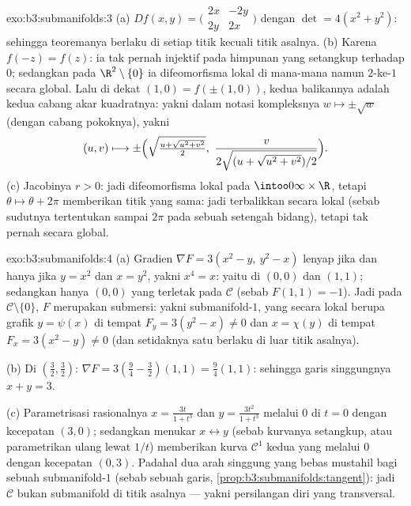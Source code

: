 \begin{solution}{exo:b3:submanifolds:3}
(a) $Df(x,y) = \bigl(\begin{smallmatrix}2x & -2y\\ 2y &
2x\end{smallmatrix}\bigr)$ dengan $\det = 4(x^2 + y^2)$: sehingga
teoremanya berlaku di setiap titik kecuali titik asalnya.
(b) Karena $f(-z) = f(z)$: ia tak pernah injektif pada himpunan yang setangkup terhadap
$0$; sedangkan pada $\R^2\setminus\{0\}$ ia difeomorfisma lokal
di mana-mana namun $2$-ke-$1$ secara global. Lalu di dekat $(1, 0) = f(\pm(1,
0))$, kedua balikannya adalah kedua cabang akar kuadratnya: yakni dalam
notasi kompleksnya $w \mapsto \pm\sqrt w$ (dengan cabang pokoknya), yakni
\[
(u, v) \longmapsto \pm\Bigl(\sqrt{\tfrac{u +
\sqrt{u^2+v^2}}{2}},\ \frac{v}{2\sqrt{(u +
\sqrt{u^2+v^2})/2}}\Bigr).
\]
(c) Jacobinya $r > 0$: jadi difeomorfisma lokal pada
$\intoo0\infty\times\R$, tetapi $\theta \mapsto \theta + 2\pi$
memberikan titik yang sama: jadi terbalikkan secara lokal (sebab sudutnya tertentukan sampai
$2\pi$ pada sebuah setengah bidang), tetapi tak pernah secara global.
\end{solution}

\begin{solution}{exo:b3:submanifolds:4}
(a) Gradien $\nabla F = 3(x^2 - y,\ y^2 - x)$ lenyap jika dan hanya jika $y = x^2$
dan $x = y^2$, yakni $x^4 = x$: yaitu di $(0,0)$ dan $(1,1)$; sedangkan hanya
$(0,0)$ yang terletak pada $\mathcal C$ (sebab $F(1,1) = -1$). Jadi pada $\mathcal
C\setminus\{0\}$, $F$ merupakan submersi: yakni submanifold-$1$, yang secara
lokal berupa grafik $y = \psi(x)$ di tempat $F_y = 3(y^2 - x) \neq 0$
dan $x = \chi(y)$ di tempat $F_x = 3(x^2 - y) \neq 0$ (dan setidaknya
satu berlaku di luar titik asalnya).

(b) Di $(\frac32, \frac32)$: $\nabla F = 3(\frac94 - \frac32)
(1, 1) = \frac94(1,1)$: sehingga garis singgungnya $x + y = 3$.

(c) Parametrisasi rasionalnya $x = \frac{3t}{1 + t^3}$ dan
$y = \frac{3t^2}{1+t^3}$ melalui $0$ di $t = 0$ dengan
kecepatan $(3, 0)$; sedangkan menukar $x \leftrightarrow y$ (sebab
kurvanya setangkup, atau parametrikan ulang lewat $1/t$) memberikan kurva
$\mathcal C^1$ kedua yang melalui $0$ dengan kecepatan $(0, 3)$. Padahal dua
arah singgung yang bebas mustahil bagi sebuah
submanifold-$1$ (sebab  sebuah garis,
\cref{prop:b3:submanifolds:tangent}): jadi $\mathcal C$ bukan
submanifold di titik asalnya --- yakni persilangan diri yang transversal.
\end{solution}

